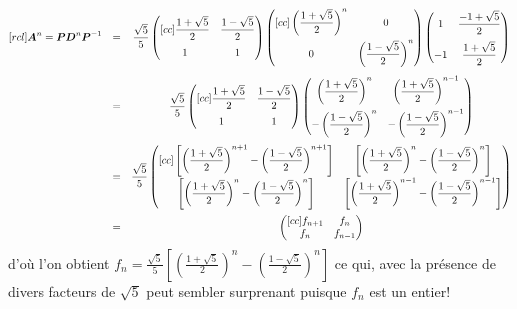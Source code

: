 \[
\begin{matrix}[rcl]
\boldsymbol{A}^n = \boldsymbol{P}\boldsymbol{D}^n \boldsymbol{P}^{-1} &=& \displaystyle\frac{\sqrt{5}}{5}
 \begin{pmatrix}[cc]
 \displaystyle \frac{1+ \sqrt{5}}{2} & \displaystyle \frac{1- \sqrt{5}}{2} \\[10pt]
 1 & 1
 \end{pmatrix}
 \begin{pmatrix}[cc]
 \displaystyle \left(\frac{1+ \sqrt{5}}{2}\right)^n & 0 \\[10pt]
 0 & \left(\displaystyle \frac{1 -\sqrt{5}}{2}\right)^n
 \end{pmatrix}
 \begin{pmatrix}
 1 & \displaystyle \frac{-1+ \sqrt{5}}{2} \\[10pt]
 -1 & \displaystyle \frac{1+ \sqrt{5}}{2}
 \end{pmatrix}
 \\[30pt]
&=& 
\displaystyle\frac{\sqrt{5}}{5}
 \begin{pmatrix}[cc]
 \displaystyle \frac{1+ \sqrt{5}}{2} & \displaystyle \frac{1- \sqrt{5}}{2} \\[10pt]
 1 & 1
 \end{pmatrix} \begin{pmatrix}
\displaystyle \left(\frac{1+ \sqrt{5}}{2}\right)^n & \displaystyle\left(\frac{1+ \sqrt{5}}{2}\right)^{n-1} \\[10pt]
-\left(\displaystyle \frac{1 -\sqrt{5}}{2}\right)^n & -\left(\displaystyle \frac{1 -\sqrt{5}}{2}\right)^{n-1}
 \end{pmatrix}
 \\[30pt]
&=& \displaystyle\frac{\sqrt{5}}{5}
\begin{pmatrix}[cc]
\displaystyle \left[\left(\frac{1+ \sqrt{5}}{2}\right)^{n+1} - \left(\displaystyle \frac{1 -\sqrt{5}}{2}\right)^{n+1}\right] & 
\displaystyle \left[\left(\frac{1+ \sqrt{5}}{2}\right)^n - \left(\displaystyle \frac{1 -\sqrt{5}}{2}\right)^n\right] \\[10pt]
\displaystyle \left[\left(\frac{1+ \sqrt{5}}{2}\right)^n - \left(\displaystyle \frac{1 -\sqrt{5}}{2}\right)^n\right] & 
\displaystyle \left[\left(\frac{1+ \sqrt{5}}{2}\right)^{n-1} - \left(\displaystyle \frac{1 -\sqrt{5}}{2}\right)^{n-1}\right]
 \end{pmatrix} \\[30pt]
 &=& \begin{pmatrix}[cc]
 f_{n+1} & f_n \\
 f_n & f_{n-1}
 \end{pmatrix}
\end{matrix}
\]
d'où l'on obtient $f_n = \displaystyle\frac{\sqrt{5}}{5} \left[\left(\frac{1+ \sqrt{5}}{2}\right)^n 
- \left( \frac{1 -\sqrt{5}}{2}\right)^n\right]$ ce qui, avec la présence de divers facteurs de $\sqrt{5}$ peut
sembler surprenant puisque $f_n$ est un entier!

